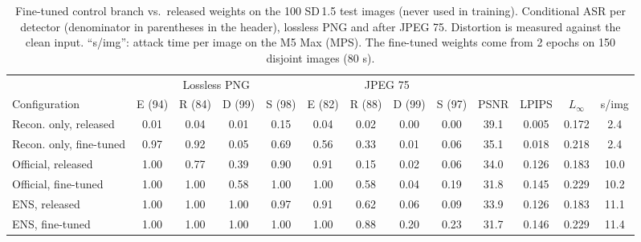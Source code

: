 \begin{table}[!t]
\caption{Fine-tuned control branch vs.\ released weights on the 100 SD\,1.5 test images (never used in training). Conditional ASR per detector (denominator in parentheses in the header), lossless PNG and after JPEG 75. Distortion is measured against the clean input. ``s/img'': attack time per image on the M5 Max (MPS). The fine-tuned weights come from 2 epochs on 150 disjoint images (80 s).}
\label{tab:ft_main}
\centering\footnotesize
\begin{tabular}{l cccc cccc ccc c}
\toprule
 & \multicolumn{4}{c}{Lossless PNG} & \multicolumn{4}{c}{JPEG 75} & & & & \\
\cmidrule(lr){2-5}\cmidrule(lr){6-9}
Configuration & E (94) & R (84) & D (99) & S (98) & E (82) & R (88) & D (99) & S (97) & PSNR & LPIPS & $L_\infty$ & s/img \\
\midrule
Recon. only, released & 0.01 & 0.04 & 0.01 & 0.15 & 0.04 & 0.02 & 0.00 & 0.00 & 39.1 & 0.005 & 0.172 & 2.4 \\
Recon. only, fine-tuned & 0.97 & 0.92 & 0.05 & 0.69 & 0.56 & 0.33 & 0.01 & 0.06 & 35.1 & 0.018 & 0.218 & 2.4 \\
\addlinespace
Official, released & 1.00 & 0.77 & 0.39 & 0.90 & 0.91 & 0.15 & 0.02 & 0.06 & 34.0 & 0.126 & 0.183 & 10.0 \\
Official, fine-tuned & 1.00 & 1.00 & 0.58 & 1.00 & 1.00 & 0.58 & 0.04 & 0.19 & 31.8 & 0.145 & 0.229 & 10.2 \\
\addlinespace
ENS, released & 1.00 & 1.00 & 1.00 & 0.97 & 0.91 & 0.62 & 0.06 & 0.09 & 33.9 & 0.126 & 0.183 & 11.1 \\
ENS, fine-tuned & 1.00 & 1.00 & 1.00 & 1.00 & 1.00 & 0.88 & 0.20 & 0.23 & 31.7 & 0.146 & 0.229 & 11.4 \\
\bottomrule
\end{tabular}
\end{table}

